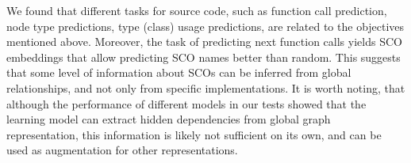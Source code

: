 \documentclass[a4paper,twoside]{article}
\begin{document}
We found that different tasks for source code, such as function call prediction, node type predictions, type (class) usage predictions, are related to the objectives mentioned above. Moreover, the task of predicting next function calls yields SCO embeddings that allow predicting SCO names better than random. This suggests that some level of information about SCOs can be inferred from global relationships, and not only from specific implementations. It is worth noting, that although the performance of different models in our tests showed that the learning model can extract hidden dependencies from global graph representation, this information is likely not sufficient on its own, and can be used as augmentation for other representations. 



{\small
}
\end{document}
